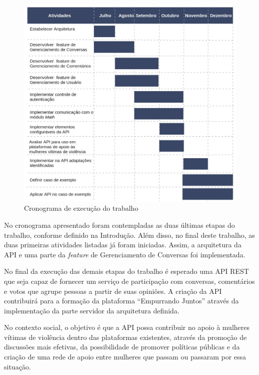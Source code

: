 \begin{figure}[ht!]
\centering
\includegraphics[scale=0.45]{figuras/cronograma.jpg}
\caption{Cronograma de execução do trabalho}
\label{fig:planejamento}
\end{figure}

No cronograma apresentado foram contempladas as duas últimas etapas do trabalho, conforme definido na Introdução. Além disso,
no final deste trabalho, as duas primeiras atividades listadas já foram iniciadas. Assim, a arquitetura da API e uma parte da \textit{feature}
de Gerenciamento de Conversas foi implementada.

No final da execução das demais etapas do trabalho é esperado uma API REST que seja capaz de fornecer um serviço de participação com conversas, comentários
e votos que agrupe pessoas a partir de suas opiniões. A criação da API contribuirá para a formação da plataforma ``Empurrando Juntos'' 
através da implementação da parte servidor da arquitetura definida.

No contexto social, o objetivo é que a API possa contribuir no apoio à mulheres vítimas de violência dentro das plataformas existentes, através
da promoção de discussões mais efetivas, da possibilidade de promover políticas públicas e da criação de uma rede de apoio entre mulheres que passam ou passaram por essa situação.

